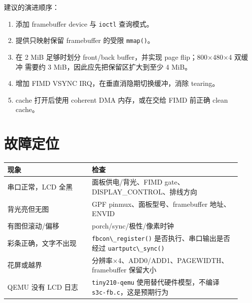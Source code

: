 建议的演进顺序：

\begin{enumerate}
\def\labelenumi{\arabic{enumi}.}
\tightlist
\item
  添加 framebuffer device 与 \passthrough{\lstinline!ioctl!} 查询模式。
\item
  提供只映射保留 framebuffer 的受限 \passthrough{\lstinline!mmap()!}。
\item
  在 2 MiB 足够时划分 front/back buffer，并实现 page flip；800×480×4
  双缓冲 需要约 3 MiB，因此应先把保留区扩大到至少 4 MiB。
\item
  增加 FIMD VSYNC IRQ，在垂直消隐期切换缓冲，消除 tearing。
\item
  cache 打开后使用 coherent DMA 内存，或在交给 FIMD 前正确 clean cache。
\end{enumerate}

\section{故障定位}\label{ux6545ux969cux5b9aux4f4d}

{\def\LTcaptype{none} %
\begin{longtable}[]{@{}p{0.34\linewidth}p{0.60\linewidth}@{}}
\toprule\noalign{}
现象 & 检查 \\
\midrule\noalign{}
\endhead
\bottomrule\noalign{}
\endlastfoot
串口正常，LCD 全黑 & 面板供电/背光、FIMD
gate、DISPLAY\_CONTROL、排线方向 \\
背光亮但无图 & GPF pinmux、面板型号、framebuffer 地址、ENVID \\
有图但滚动/偏移 & porch/sync/极性/像素时钟 \\
彩条正确，文字不出现 & \passthrough{\lstinline!fbcon\_register()!}
是否执行、串口输出是否经过 \passthrough{\lstinline!uartputc\_sync()!} \\
花屏或越界 & 分辨率×4、ADD0/ADD1、PAGEWIDTH、framebuffer 保留大小 \\
QEMU 没有 LCD 日志 & \passthrough{\lstinline!tiny210-qemu!}
使用替代硬件模型，不编译
\passthrough{\lstinline!s3c-fb.c!}，这是预期行为 \\
\end{longtable}
}
